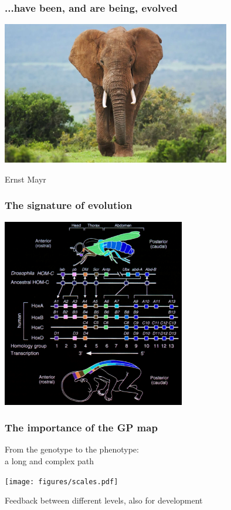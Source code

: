 \documentclass[compress]{beamer}
\begin{document}
\begin{frame}
\frametitle{...have been, and are being, evolved}   
\begin{center}
\includegraphics[width=0.75\textwidth]{figures/elephant.jpg} 
\end{center}

Ernst Mayr

\end{frame}

\begin{frame}
\frametitle{The signature of evolution}   

\begin{center}
\includegraphics[width=0.6\textwidth]{figures/evodevo.jpg} 
\end{center}

\end{frame}


\begin{frame}
\frametitle{The importance of the GP map}   

From the genotype to the phenotype:\\ a long and complex path
\begin{center}
\texttt{[image: figures/scales.pdf]} 
\end{center}

Feedback between different levels, also for development
\end{frame}
\end{document}
